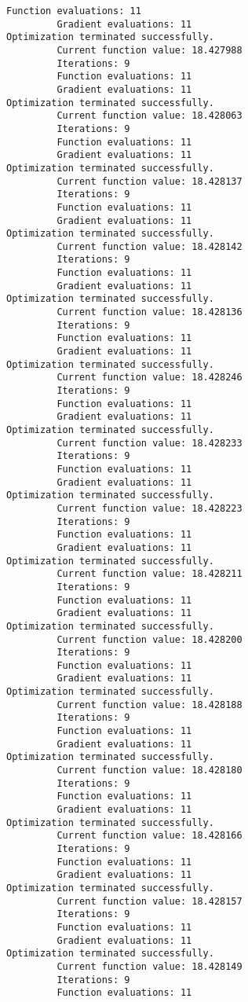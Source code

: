 \documentclass[11pt]{article}
\begin{document}
\begin{Verbatim}[commandchars=\\\{\}]
         Function evaluations: 11
         Gradient evaluations: 11
Optimization terminated successfully.
         Current function value: 18.427988
         Iterations: 9
         Function evaluations: 11
         Gradient evaluations: 11
Optimization terminated successfully.
         Current function value: 18.428063
         Iterations: 9
         Function evaluations: 11
         Gradient evaluations: 11
Optimization terminated successfully.
         Current function value: 18.428137
         Iterations: 9
         Function evaluations: 11
         Gradient evaluations: 11
Optimization terminated successfully.
         Current function value: 18.428142
         Iterations: 9
         Function evaluations: 11
         Gradient evaluations: 11
Optimization terminated successfully.
         Current function value: 18.428136
         Iterations: 9
         Function evaluations: 11
         Gradient evaluations: 11
Optimization terminated successfully.
         Current function value: 18.428246
         Iterations: 9
         Function evaluations: 11
         Gradient evaluations: 11
Optimization terminated successfully.
         Current function value: 18.428233
         Iterations: 9
         Function evaluations: 11
         Gradient evaluations: 11
Optimization terminated successfully.
         Current function value: 18.428223
         Iterations: 9
         Function evaluations: 11
         Gradient evaluations: 11
Optimization terminated successfully.
         Current function value: 18.428211
         Iterations: 9
         Function evaluations: 11
         Gradient evaluations: 11
Optimization terminated successfully.
         Current function value: 18.428200
         Iterations: 9
         Function evaluations: 11
         Gradient evaluations: 11
Optimization terminated successfully.
         Current function value: 18.428188
         Iterations: 9
         Function evaluations: 11
         Gradient evaluations: 11
Optimization terminated successfully.
         Current function value: 18.428180
         Iterations: 9
         Function evaluations: 11
         Gradient evaluations: 11
Optimization terminated successfully.
         Current function value: 18.428166
         Iterations: 9
         Function evaluations: 11
         Gradient evaluations: 11
Optimization terminated successfully.
         Current function value: 18.428157
         Iterations: 9
         Function evaluations: 11
         Gradient evaluations: 11
Optimization terminated successfully.
         Current function value: 18.428149
         Iterations: 9
         Function evaluations: 11

\end{Verbatim}
\end{document}
